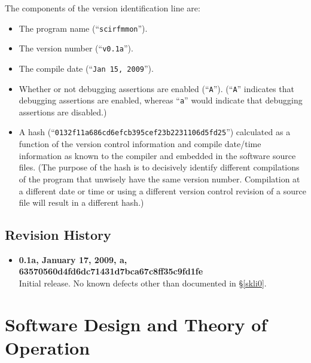 \documentclass[letterpaper,10pt,titlepage]{article}
\begin{document}
The components of the version identification line are:

\begin{itemize}
\item The program name (``\texttt{scirfmmon}'').
\item The version number (``\texttt{v0.1a}'').
\item The compile date (``\texttt{Jan 15, 2009}'').
\item Whether or not debugging assertions are enabled (``\texttt{A}'').  (``\texttt{A}''
      indicates that debugging assertions are enabled, whereas ``\texttt{a}''
      would indicate that debugging assertions are disabled.)
\item A hash (``\texttt{0132f11a686cd6efcb395cef23b2231106d5fd25}'')
      calculated as a function
      of the version control information and compile date/time
      information as known to the compiler and embedded in the software source files.
      (The purpose of the hash is to decisively identify different compilations of the
      program that unwisely have the same version number.  Compilation at a different date or time
      or using a different version control revision 
      of a source file will
      result in a different hash.)
\end{itemize}


\subsection{Revision History}
\label{siov0:srhs0}

\begin{itemize}
\item \textbf{0.1a, January 17, 2009, a,\\
      63570560d4fd6dc71431d7bca67c8ff35c9fd1fe}\\
      Initial release.  No known defects other than documented in
      \S{}\ref{skli0}.
\end{itemize}

\section{Software Design and Theory of Operation} 
\label{sswd0}
\end{document}
